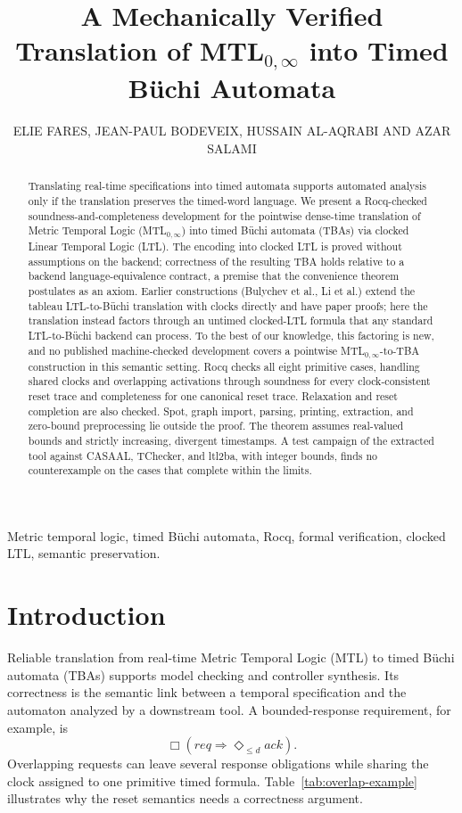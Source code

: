 \documentclass{ieeeaccess}
\title{A Mechanically Verified Translation of MTL$_{0,\infty}$ into Timed B\"uchi Automata}
\author{\uppercase{Elie Fares}\authorrefmark{1},
\uppercase{Jean-Paul Bodeveix}\authorrefmark{2},
\uppercase{Hussain Al-Aqrabi}\authorrefmark{1} AND
\uppercase{Azar Salami}\authorrefmark{1}}
\begin{document}
\history{}
\doi{}

\begin{abstract}
Translating real-time specifications into timed automata supports automated
analysis only if the translation preserves the timed-word language. We present a Rocq-checked soundness-and-completeness development for
the pointwise dense-time translation of Metric Temporal Logic
(MTL$_{0,\infty}$) into timed B\"uchi automata (TBAs) via clocked Linear
Temporal Logic (LTL). The encoding into clocked LTL is proved without assumptions on
the backend; correctness of the resulting TBA holds relative to a backend
language-equivalence contract, a premise that the convenience theorem postulates as an axiom. Earlier constructions (Bulychev et al., Li et al.) extend the tableau LTL-to-B\"uchi
translation with clocks directly and have paper proofs; here the translation
instead factors through an untimed clocked-LTL formula that any standard
LTL-to-B\"uchi backend can process. To the best of our knowledge, this
factoring is new, and no published machine-checked development covers a
pointwise MTL$_{0,\infty}$-to-TBA construction in this semantic setting. Rocq checks all eight primitive cases, handling shared clocks and overlapping activations
through soundness for every clock-consistent reset trace and completeness for
one canonical reset trace. Relaxation and reset completion are
also checked. Spot, graph import, parsing, printing,
extraction, and zero-bound preprocessing lie outside the proof. The theorem assumes real-valued bounds and strictly
increasing, divergent timestamps. A test campaign of the extracted tool against CASAAL, TChecker, and ltl2ba, with
integer bounds, finds no counterexample on the cases that complete within the limits.
\end{abstract}

\begin{keywords}
Metric temporal logic, timed B\"uchi automata, Rocq, formal verification,
clocked LTL, semantic preservation.
\end{keywords}
\maketitle

\section{Introduction}
\label{sec:introduction}
Reliable translation from real-time Metric Temporal Logic (MTL) to timed
B\"uchi automata (TBAs) supports model checking and controller synthesis. Its
correctness is the semantic link between a temporal specification and the
automaton analyzed by a downstream tool. A bounded-response requirement, for example, is
\begin{equation*}
\Box(\mathit{req}\Rightarrow\Diamond_{\le d}\mathit{ack}).
\end{equation*}
Overlapping requests can leave several response obligations while
sharing the clock assigned to one primitive timed formula. Table~\ref{tab:overlap-example}
illustrates why the reset semantics needs a correctness argument.
\end{document}
